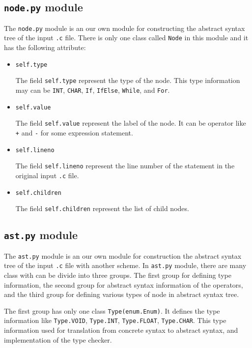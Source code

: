 \documentclass{article}
\newcommand{\code}[1]{\texttt{#1}}
\begin{document}
	\subsection{\code{node.py} module}
	
	The \code{node.py} module is an our own module for constructing the abstract syntax tree of the input \code{.c} file. There is only one class called \code{Node} in this module and it has the following attribute:
	
	\begin{itemize}
		\item \code{self.type}
		
		The field \code{self.type} represent the type of the node. This type information may can be \code{INT}, \code{CHAR}, \code{If}, \code{IfElse}, \code{While}, and \code{For}.
		
		\item \code{self.value}
		
		The field \code{self.value} represent the label of the node. It can be operator like \code{+} and \code{-} for some expression statement.
		
		\item \code{self.lineno}
		
		The field \code{self.lineno} represent the line number of the statement in the original input \code{.c} file.
		
		\item \code{self.children}
		
		The field \code{self.children} represent the list of child nodes.
	\end{itemize}
	
	\subsection{\code{ast.py} module}
	
	The \code{ast.py} module is an our own module for construction the abstract syntax tree of the input \code{.c} file with another scheme. In \code{ast.py} module, there are many class with can be divide into three groups. The first group for defining type information, the second group for abstract syntax information of the operators, and the third group for defining various types of node in abstract syntax tree.
	
	The first group has only one class \code{Type(enum.Enum)}. It defines the type information like \code{Type.VOID}, \code{Type.INT}, \code{Type.FLOAT}, \code{Type.CHAR}. This type information used for translation from concrete syntax to abstract syntax, and implementation of the type checker.
	
\end{document}
